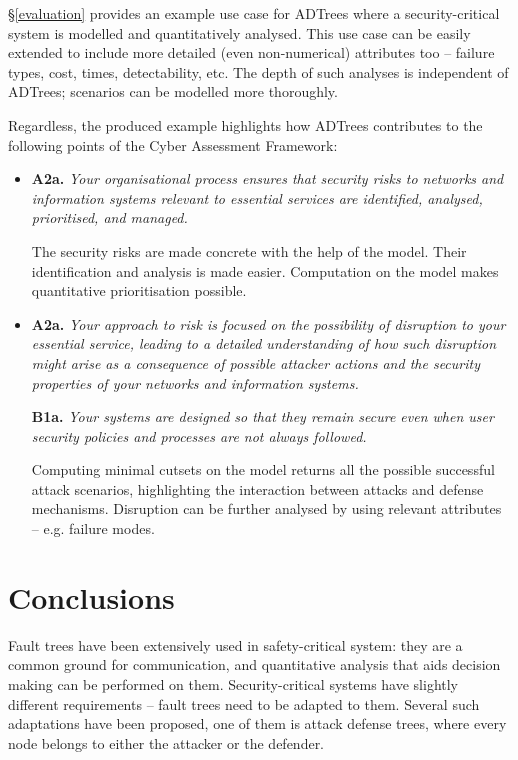 \documentclass{scrreprt}
\begin{document}
\S\ref{evaluation} provides an example use case for ADTrees where a
security-critical system is modelled and quantitatively analysed. This use case
can be easily extended to include more detailed (even non-numerical) attributes
too -- failure types, cost, times, detectability, etc. The depth of such
analyses is  independent of ADTrees; scenarios can be modelled more thoroughly.

Regardless, the produced example highlights how ADTrees contributes to the
following points of the Cyber Assessment Framework:

\begin{itemize}
    \item 
        \textbf{A2a.} \textit{Your organisational process ensures that security
        risks to networks and information systems relevant to essential services
        are identified, analysed, prioritised, and managed.}

        The security risks are made concrete with the help of the model.  Their
        identification and analysis is made easier. Computation on the model
        makes quantitative prioritisation possible.

    \item
        \textbf{A2a.} \textit{Your approach to risk is focused on the
        possibility of disruption to your essential service, leading to a
        detailed understanding of how such disruption might arise as a
        consequence of possible attacker actions and the security properties of
        your networks and information systems.}

        \textbf{B1a.} \textit{Your systems are designed so that they remain
        secure even when user security policies and processes are not always
        followed.}

        Computing minimal cutsets on the model returns all the possible
        successful attack scenarios, highlighting the interaction between
        attacks and defense mechanisms. Disruption can be further analysed by
        using relevant attributes -- e.g. failure modes.
\end{itemize}

\chapter{Conclusions}
\label{conclusions}

Fault trees have been extensively used in safety-critical system: they are a
common ground for communication, and quantitative analysis that aids decision
making can be performed on them. Security-critical systems have slightly
different requirements -- fault trees need to be adapted to them. Several such
adaptations have been proposed, one of them is attack defense trees, where every
node belongs to either the attacker or the defender.
\end{document}
